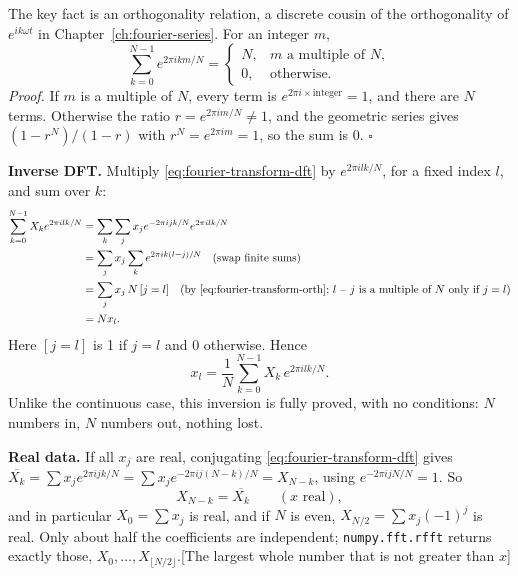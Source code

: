 The key fact is an orthogonality relation, a discrete cousin of the orthogonality of $e^{ik\omega t}$ in Chapter~\ref{ch:fourier-series}. For an integer $m$,
\begin{equation}
\sum_{k=0}^{N-1}e^{2\pi ikm/N}=\begin{cases}N,&m\text{ a multiple of }N,\\0,&\text{otherwise.}\end{cases}
\label{eq:fourier-transform-orth}
\end{equation}
\emph{Proof.} If $m$ is a multiple of $N$, every term is $e^{2\pi i\times\text{integer}}=1$, and there are $N$ terms. Otherwise the ratio $r=e^{2\pi im/N}\ne1$, and the geometric series gives $(1-r^N)/(1-r)$ with $r^N=e^{2\pi im}=1$, so the sum is $0$. $\square$

\textbf{Inverse DFT.} Multiply \eqref{eq:fourier-transform-dft} by $e^{2\pi ilk/N}$, for a fixed index $l$, and sum over $k$:
\begin{align}
\sum_{k=0}^{N-1}X_ke^{2\pi ilk/N}&=\sum_{k}\sum_{j}x_je^{-2\pi ijk/N}e^{2\pi ilk/N}\notag\\
&=\sum_{j}x_j\sum_{k}e^{2\pi ik(l-j)/N}\quad\text{(swap finite sums)}\notag\\
&=\sum_jx_j\,N\,[j=l]\quad\text{(by \eqref{eq:fourier-transform-orth}; }l-j\text{ is a multiple of }N\text{ only if }j=l)\notag\\
&=Nx_l .\notag
\end{align}
Here $[j=l]$ is 1 if $j=l$ and 0 otherwise. Hence
\begin{equation}
x_l=\frac1N\sum_{k=0}^{N-1}X_k\,e^{2\pi ilk/N}.
\label{eq:fourier-transform-idft}
\end{equation}
Unlike the continuous case, this inversion is fully proved, with no conditions: $N$ numbers in, $N$ numbers out, nothing lost.

\textbf{Real data.} If all $x_j$ are real, conjugating \eqref{eq:fourier-transform-dft} gives $\overline{X_k}=\sum x_je^{2\pi ijk/N}=\sum x_je^{-2\pi ij(N-k)/N}=X_{N-k}$, using $e^{-2\pi ijN/N}=1$. So
\begin{equation}
X_{N-k}=\overline{X_k}\qquad(x\text{ real}),
\label{eq:fourier-transform-dftsym}
\end{equation}
and in particular $X_0=\sum x_j$ is real, and if $N$ is even, $X_{N/2}=\sum x_j(-1)^j$ is real. Only about half the coefficients are independent; \texttt{numpy.fft.rfft} returns exactly those, $X_0,\dots,X_{\lfloor N/2\rfloor}$.[The largest whole number that is not greater than $x$]

